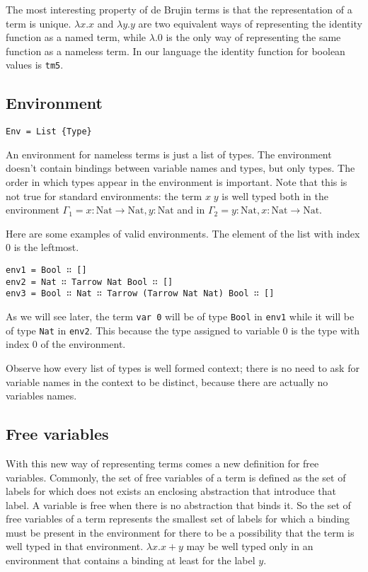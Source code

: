 \documentclass{article}
\begin{document}
The most interesting property of de Brujin terms is that the representation of a term is unique.
$\lambda x.x$ and $\lambda y.y$ are two equivalent ways of representing the identity function as a named term, while $\lambda.0$ is the only way of representing the same function as a nameless term.
In our language the identity function for boolean values is \texttt{tm5}.


\subsection*{Environment}

\begin{verbatim}
Env = List {Type}
\end{verbatim}

An environment for nameless terms is just a list of types.
The environment doesn't contain bindings between variable names and types, but only types.
The order in which types appear in the environment is important.
Note that this is not true for standard environments: the term $x \; y$ is well typed both in the environment $\Gamma_1 = x:\text{Nat} \to \text{Nat}, y:\text{Nat}$ and in $\Gamma_2 = y:\text{Nat}, x:\text{Nat} \to \text{Nat}$. 

Here are some examples of valid environments.
The element of the list with index 0 is the leftmost.

\begin{verbatim}
env1 = Bool ∷ []
env2 = Nat ∷ Tarrow Nat Bool ∷ []
env3 = Bool ∷ Nat ∷ Tarrow (Tarrow Nat Nat) Bool ∷ []
\end{verbatim}

As we will see later, the term \texttt{var 0} will be of type \texttt{Bool} in \texttt{env1} while it will be of type \texttt{Nat} in \texttt{env2}.
This because the type assigned to variable 0 is the type with index 0 of the environment.

Observe how every list of types is well formed context; there is no need to ask for variable names in the context to be distinct, because there are actually no variables names.


\subsection*{Free variables}

With this new way of representing terms comes a new definition for free variables.
Commonly, the set of free variables of a term is defined as the set of labels for which does not exists an enclosing abstraction that introduce that label.
A variable is free when there is no abstraction that binds it.
So the set of free variables of a term represents the smallest set of labels for which a binding must be present in the environment for there to be a possibility that the term is well typed in that environment.
$\lambda x. x + y$ may be well typed only in an environment that contains a binding at least for the label $y$.
\end{document}
